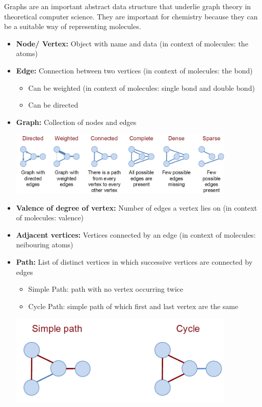 
Graphs are an important abstract data structure that underlie graph theory in theoretical computer science. They are important for chemistry because they can be a suitable way of representing molecules.

\begin{itemize}
    \item \textbf{Node/ Vertex:} Object with name and data (in context of molecules: the atoms)
    \item \textbf{Edge:} Connection between two vertices (in context of molecules: the bond)
    \begin{itemize}
        \item Can be weighted (in context of molecules: single bond and double bond)
        \item Can be directed 
    \end{itemize}
    \item \textbf{Graph:} Collection of nodes and edges
    \begin{center}\includegraphics[width=0.85\textwidth]{img/graphs/DifferentGraphs.png}\end{center}
    \item \textbf{Valence of degree of vertex:} Number of edges a vertex lies on (in context of molecules: valence)
    \item \textbf{Adjacent vertices:} Vertices connected by an edge (in context of molecules: neibouring atoms)
    \item \textbf{Path:} List of distinct vertices in which successive vertices are connected by edges
    \begin{itemize}
        \item Simple Path: path with no vertex occurring twice
        \item Cycle Path: simple path of which first and last vertex are the same
    \end{itemize}
    \begin{center}\includegraphics[width=0.85\textwidth]{img/graphs/PathGraphs.png}\end{center}

\end{itemize}
